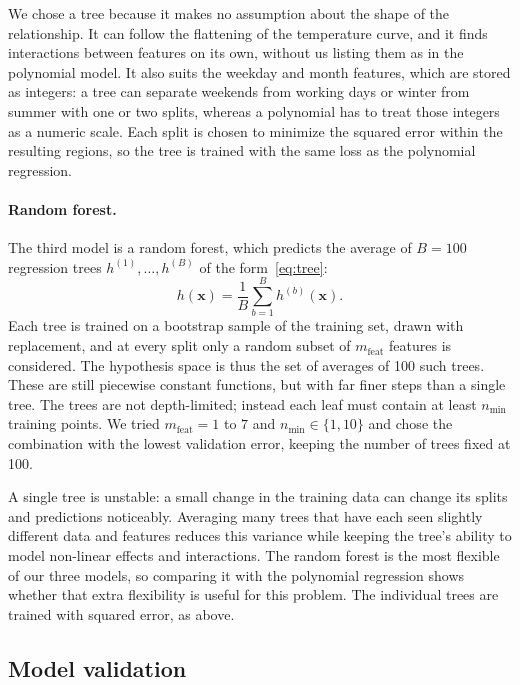 \documentclass[10pt,a4paper]{article}
\begin{document}
We chose a tree because it makes no assumption about the shape of the relationship. It can
follow the flattening of the temperature curve, and it finds interactions between features
on its own, without us listing them as in the polynomial model. It also suits the weekday
and month features, which are stored as integers: a tree can separate weekends from working
days or winter from summer with one or two splits, whereas a polynomial has to treat those
integers as a numeric scale. Each split is chosen to minimize the squared error within the
resulting regions, so the tree is trained with the same loss as the polynomial regression.

\paragraph{Random forest.}
The third model is a random forest, which predicts the average of $B = 100$ regression
trees $h^{(1)}, \dots, h^{(B)}$ of the form~\eqref{eq:tree}:
\begin{equation}
  h(\mathbf{x}) = \frac{1}{B} \sum_{b=1}^{B} h^{(b)}(\mathbf{x}).
  \label{eq:forest}
\end{equation}
Each tree is trained on a bootstrap sample of the training set, drawn with replacement, and
at every split only a random subset of $m_{\text{feat}}$ features is considered. The
hypothesis space is thus the set of averages of 100 such trees. These are still piecewise
constant functions, but with far finer steps than a single tree. The trees are not
depth-limited; instead each leaf must contain at least $n_{\min}$ training points. We tried
$m_{\text{feat}} = 1$ to $7$ and $n_{\min} \in \{1, 10\}$ and chose the combination with the
lowest validation error, keeping the number of trees fixed at 100.

A single tree is unstable: a small change in the training data can change its splits and
predictions noticeably. Averaging many trees that have each seen slightly different data and
features reduces this variance while keeping the tree's ability to model non-linear effects
and interactions. The random forest is the most flexible of our three models, so comparing
it with the polynomial regression shows whether that extra flexibility is useful for this
problem. The individual trees are trained with squared error, as above.

\subsection{Model validation}
\label{sec:validation}
\end{document}
